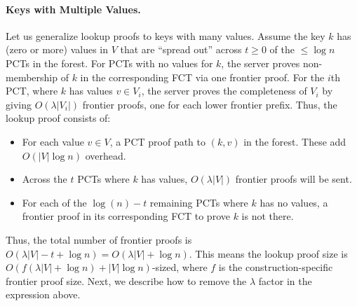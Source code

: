 \paragraph{Keys with Multiple Values.}
Let us generalize lookup proofs to keys with many values.
Assume the key $k$ has (zero or more) values in $V$ that are ``spread out'' across $t\ge 0$ of the $\le \log{n}$ PCTs in the forest.
For PCTs with no values for $k$, the server proves non-membership of $k$ in the corresponding FCT via one frontier proof.
For the $i$th PCT, where $k$ has values $v \in V_i$, the server proves the completeness of $V_i$ by giving $O(\lambda|V_i|)$ frontier proofs, one for each lower frontier prefix.
Thus, the lookup proof consists of:

\begin{itemize}
    \item For each value $v\in V$, a PCT proof path to $(k,v)$ in the forest. These add $O(|V|\log{n})$ overhead.
    \item Across the $t$ PCTs where $k$ has values, $O(\lambda|V|)$ frontier proofs will be sent.
    \item For each of the $\log{(n)}-t$ remaining PCTs where $k$ has no values, a frontier proof in its corresponding FCT to prove $k$ is not there.
\end{itemize}

Thus, the total number of frontier proofs is $O\left(\lambda|V| - t + \log{n}\right)=O\left(\lambda|V| + \log{n}\right)$.
This means the lookup proof size is $O\left(f\left(\lambda|V| + \log{n}\right) + |V|\log{n}\right)$-sized, where $f$ is the construction-specific frontier proof size.
%
Next, we describe how to remove the $\lambda$ factor in the expression above.
 
